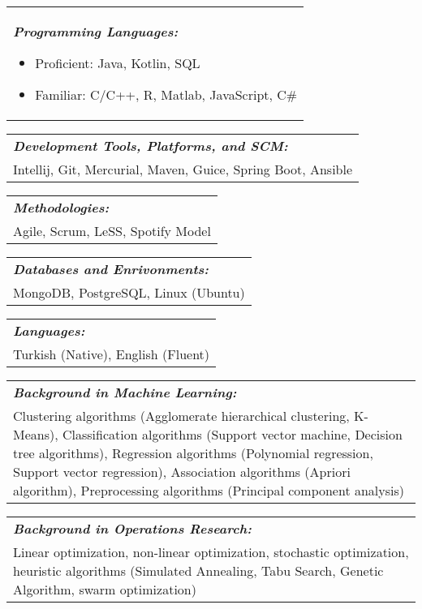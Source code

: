 \documentclass[11pt]{article}
\newcommand{\bigspace}{\vspace{0.4cm}}
\begin{document}
\bigspace
\begin{tabular}{p{18cm}}
\textit{\textbf{Programming Languages:}}
\vspace{-7pt}
\begin{itemize}
\setlength\itemsep{0em}
\item Proficient: Java, Kotlin, SQL
\item Familiar: C/C++, R, Matlab, JavaScript, C\#
\end{itemize}
\end{tabular}

\begin{tabular}{p{18cm}}
\textit{\textbf{Development Tools, Platforms, and SCM:}} \\
Intellij, Git, Mercurial, Maven, Guice, Spring Boot, Ansible
\end{tabular}

\bigspace

\begin{tabular}{p{18cm}}
\textit{\textbf{Methodologies:}} \\
Agile, Scrum, LeSS, Spotify Model
\end{tabular}

\bigspace

\begin{tabular}{p{18cm}}
\textit{\textbf{Databases and Enrivonments:}} \\
MongoDB, PostgreSQL, Linux (Ubuntu)
\end{tabular}

\bigspace

\begin{tabular}{p{18cm}}
\textit{\textbf{Languages:}}\\
Turkish (Native), English (Fluent)
\end{tabular}

\bigspace

\begin{tabular}{p{18cm}}
\textit{\textbf{Background in Machine Learning:}}\\
Clustering algorithms (Agglomerate hierarchical clustering, K-Means), Classification algorithms (Support vector machine, Decision tree algorithms), Regression algorithms (Polynomial regression, Support vector regression), Association algorithms (Apriori algorithm), Preprocessing algorithms (Principal component analysis)
\end{tabular}


\begin{tabular}{p{18cm}}
\textit{\textbf{Background in Operations Research:}}\\
Linear optimization, non-linear optimization, stochastic optimization, heuristic algorithms (Simulated Annealing, Tabu Search, Genetic Algorithm, swarm optimization)
\end{tabular}
\end{document}

